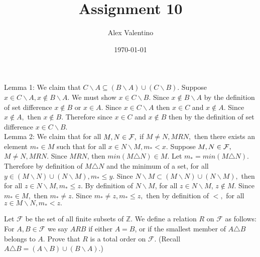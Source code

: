 \documentclass[12pt, letterpaper]{article}
\date{\today}
\author{Alex Valentino}
\title{Assignment 10}
\begin{document}
Lemma 1: We claim that $C\backslash A \subseteq (B \backslash A) \cup (C \backslash B)$.  Suppose $x\in C \backslash A, x \not \in B \backslash A$. We must show $x \in C \backslash B.$  Since $x \not \in B \backslash A$ by the definition of set difference $x \not \in B $ or $x \in A$.  Since $x \in C \backslash A$ then $x \in C$ and $x \not \in A.$  Since $x \not \in A,$ then $x \not \in B.$  Therefore since $x\in C$ and $x \not \in B$ then by the definition of set difference $x \in C \backslash B.$\\	
	
Lemma 2: We claim that for all $M,N \in \cal F,$ if $M \neq N, M R N,$ then there exists an element $m_* \in M$ such that for all $x \in N \backslash M, m_* < x.$  Suppose $M,N \in \cal F,$ $M \neq N, M R N$.  Since $M R N$, then $min (M\triangle N) \in M.$  Let $m_* = min (M\triangle N).$  Therefore by definition of $M \triangle N$ and the minimum of a set, for all $y \in (M \backslash N) \cup (N \backslash M), m_* \leq y.$  Since $N \backslash M \subset (M \backslash N) \cup (N \backslash M),$ then for all $z \in N \backslash M, m_* \leq z.$  By definition of $N \backslash M$, for all $z \in N \backslash M$, $z \not \in M.$  Since $m_* \in M,$ then $m_* \neq z$.  Since $m_* \neq z, m_* \leq z,$ then by definition of $<,$ for all $z \in M \backslash N, m_* < z.$
	
	
	Let $\mathcal{F}$ be the set of all finite subsets of $\mathbb{Z}$.  We define a relation $R$
on $\mathcal{F}$ as follows: For $A,B \in \mathcal{F}$ we say $ARB$ if either $A=B$, or if the smallest member
of $A \triangle B$ belongs to $A$.  Prove that $R$ is a total order on $\mathcal{F}$. (Recall $A \triangle B=( A \backslash B) \cup (B \backslash A)$.)\\
\end{document}
